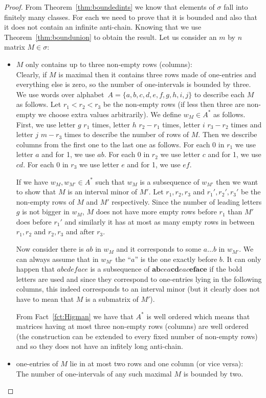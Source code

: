 \begin{proof}
From Theorem~\ref{thm:boundedints} we know that elements of $\sigma$ fall into finitely many classes. For each we need to prove that it is bounded and also that it does not contain an infinite anti-chain. Knowing that we use Theorem~\ref{thm:boundunion} to obtain the result. Let us consider an $m$ by $n$ matrix $M\in\sigma$:
\begin{itemize}
	\item $M$ only contains up to three non-empty rows (columns):\\
		Clearly, if $M$ is maximal then it contains three rows made of one-entries and everything else is zero, so the number of one-intervals is bounded by three.\\
		
		We use words over alphabet~$A=\{a,b,c,d,e,f,g,h,i,j\}$ to describe each $M$ as follows. Let $r_1<r_2<r_3$ be the non-empty rows (if less then three are non-empty we choose extra values arbitrarily). We define $w_M\in A^*$ as follows. First, we use letter $g$ $r_1$ times, letter $h$ $r_2-r_1$ times, letter $i$ $r_3-r_2$ times and letter $j$ $m-r_3$ times to describe the number of rows of $M$. Then we describe columns from the first one to the last one as follows. For each 0 in $r_1$ we use letter $a$ and for 1, we use $ab$. For each 0 in $r_2$ we use letter $c$ and for 1, we use $cd$. For each 0 in $r_3$ we use letter $e$ and for 1, we use $ef$.
		
		If we have $w_M,w_{M'}\in A^*$ such that $w_M$ is a subsequence of $w_{M'}$ then we want to show that $M$ is an interval minor of $M'$. Let $r_1,r_2,r_3$ and $r_1',r_2',r_3'$ be the non-empty rows of $M$ and $M'$ respectively. Since the number of leading letters $g$ is not bigger in $w_M$, $M$ does not have more empty rows before $r_1$ than $M'$ does before $r_1'$ and similarly it has at most as many empty rows in between $r_1,r_2$ and $r_2,r_3$ and after $r_3$.

		Now consider there is $ab$ in $w_M$ and it corresponds to some $a\dots b$ in $w_{M'}$. We can always assume that in $w_{M'}$ the ``$a$'' is the one exactly before $b$. It can only happen that $abcdeface$ is a subsequence of $\textbf{ab}cea\textbf{cd}eac\textbf{eface}$ if the bold letters are used and since they correspond to one-entries lying in the following columns, this indeed corresponds to an interval minor (but it clearly does not have to mean that $M$ is a submatrix of $M'$).

		From Fact~\ref{fct:Higman} we have that $A^*$ is well ordered which means that matrices having at most three non-empty rows (columns) are well ordered (the construction can be extended to every fixed number of non-empty rows) and so they does not have an infitely long anti-chain.
	\item one-entries of $M$ lie in at most two rows and one column (or vice versa):\\
		The number of one-intervals of any such maximal $M$ is bounded by two.\\
		

\end{itemize}
\end{proof}
